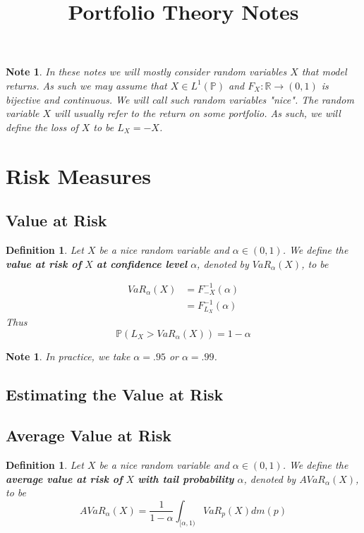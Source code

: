 \documentclass[12pt]{amsart}
\newtheorem{defn}[thm]{Definition}
\newtheorem{note}[thm]{Note}
\newcommand{\al}{\alpha}
\newcommand{\R}{\mathbb{R}}
\renewcommand{\P}{\mathbb{P}}
\begin{document}
\title{Portfolio Theory Notes}
\maketitle

\tableofcontents

\begin{note}
In these notes we will mostly consider random variables $X$ that model returns. As such we may assume that $X \in L^1(\P)$ and $F_X:\R \rightarrow (0,1)$ is bijective and continuous. We will call such random variables "nice". The random variable $X$ will usually refer to the return on some portfolio. As such, we will define the loss of $X$ to be $L_X = -X$.
\end{note}

\section{Risk Measures}

\subsection{Value at Risk}

\begin{defn}
Let $X$ be a nice random variable and $\al \in (0,1)$. We define the \textbf{value at risk of } $X$ \textbf{at confidence level } $\al$, denoted by $VaR_{\al}(X)$, to be 

\begin{align*}
VaR_{\al}(X) 
&= F^{-1}_{-X}(\al)\\
&= F^{-1}_{L_X}(\al)
\end{align*}
Thus $$\P(L_X > VaR_{\al}(X)) = 1- \al$$
\end{defn}

\begin{note}
In practice, we take $\al= .95$ or $\al= .99$. 
\end{note}

\subsection{Estimating the Value at Risk}

\subsection{Average Value at Risk}

 \begin{defn}
Let $X$ be a nice random variable and $\al\in (0,1)$. We define the \textbf{average value at risk of } $X$ \textbf{with tail probability } $\al$, denoted by $AVaR_{\al}(X)$, to be $$AVaR_{\al}(X) = \frac{1}{1-\al}\int_{[\al,1)}VaR_p(X)dm(p)$$
\end{defn}
\end{document}
